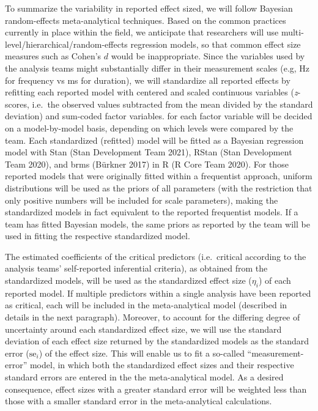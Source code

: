 \documentclass[
  12pt,
]{article}
\begin{document}
To summarize the variability in reported effect sized, we will follow Bayesian random-effects meta-analytical techniques.
Based on the common practices currently in place within the field, we anticipate that researchers will use multi-level/hierarchical/random-effects regression models, so that common effect size measures such as Cohen's \(d\) would be inappropriate.
Since the variables used by the analysis teams might substantially differ in their measurement scales (e.g, Hz for frequency vs ms for duration), we will standardize all reported effects by refitting each reported model with centered and scaled continuous variables (\emph{z}-scores, i.e.~the observed values subtracted from the mean divided by the standard deviation) and sum-coded factor variables.
 for each factor variable will be decided on a model-by-model basis, depending on which levels were compared by the team.
Each standardized (refitted) model will be fitted as a Bayesian regression model with Stan (Stan Development Team 2021), RStan (Stan Development Team 2020), and brms (Bürkner 2017) in R (R Core Team 2020).
For those reported models that were originally fitted within a frequentist approach, uniform distributions will be used as the priors of all parameters (with the restriction that only positive numbers will be included for scale parameters), making the standardized models in fact equivalent to the reported frequentist models.
If a team has fitted Bayesian models, the same priors as reported by the team will be used in fitting the respective standardized model.

The estimated coefficients of the critical predictors (i.e.~critical according to the analysis teams' self-reported inferential criteria), as obtained from the standardized models, will be used as the standardized effect size (\(\eta_i\)) of each reported model.
If multiple predictors within a single analysis have been reported as critical, each will be included in the meta-analytical model (described in details in the next paragraph).
Moreover, to account for the differing degree of uncertainty around each standardized effect size, we will use the standard deviation of each effect size returned by the standardized models as the standard error (\(\text{se}_i\)) of the effect size.
This will enable us to fit a so-called ``measurement-error'' model, in which both the standardized effect sizes and their respective standard errors are entered in the the meta-analytical model.
As a desired consequence, effect sizes with a greater standard error will be weighted less than those with a smaller standard error in the meta-analytical calculations.
\end{document}
